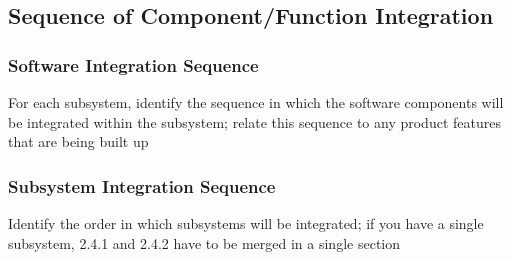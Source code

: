 \subsection{Sequence of Component/Function Integration} 
\subsubsection{Software Integration Sequence} For each subsystem, identify the sequence in which the software components will be integrated within the subsystem; relate this sequence to any product features that are being built up
\subsubsection{Subsystem Integration Sequence} Identify the order in which subsystems will be integrated;  if you have a single subsystem, 2.4.1 and 2.4.2 have to be merged in a single section





